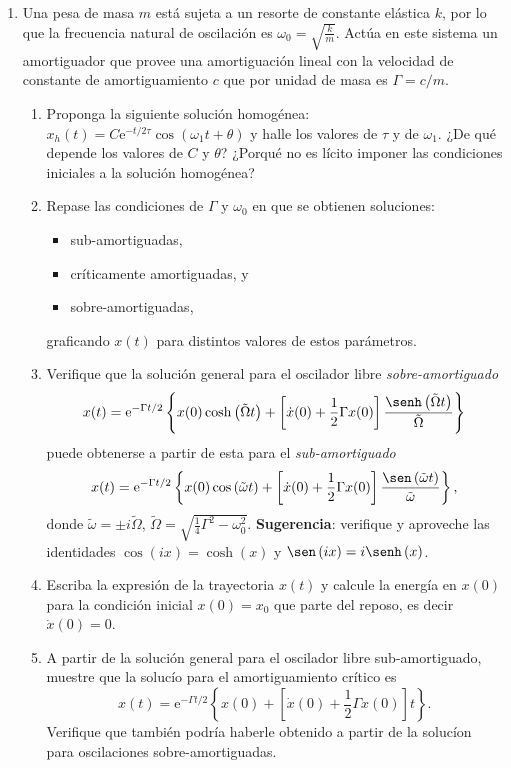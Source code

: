 \documentclass[11pt,spanish,a4paper]{article}
\begin{document}
\begin{enumerate}
\item Una pesa de masa $m$ está sujeta a un resorte de constante elástica $k$, por lo que la frecuencia natural de oscilación es $\omega_0 = \sqrt{ \frac{k}{m} }$.
Actúa en este sistema un amortiguador que provee una amortiguación lineal con la velocidad de constante de amortiguamiento \(c\) que por unidad de masa es $\Gamma= c/m$.
	\begin{enumerate}
	\item Proponga la siguiente solución homogénea: $x_h(t) = C\mathrm{e}^{-t/2\tau}\cos(\omega_1 t + \theta )$ y halle los valores de $\tau$ y de $\omega_1$.
	¿De qué depende los valores de $C$ y $\theta$?
	¿Porqué no es lícito imponer las condiciones iniciales a la solución homogénea?
	\item Repase las condiciones de \(\Gamma\) y \(\omega_0\) en que se obtienen soluciones:
	\begin{itemize}
		\item sub-amortiguadas,
		\item críticamente amortiguadas, y
		\item sobre-amortiguadas,
	\end{itemize} \label{subamortiguado}
	graficando \(x(t)\) para distintos valores de estos parámetros.
	\item Verifique que la solución general para el oscilador libre \emph{sobre-amortiguado}
	\[
		x(t) = \operatorname{e}^{-\Gamma t/2} \left\{ x(0) \cosh \left( \tilde{\Omega}  t \right) + \left[ \dot{x}(0) + \frac{1}{2} \Gamma x(0) \right] \frac{ \senh \left( \tilde{\Omega} t \right) }{ \tilde{\Omega} } \right\} 
	\]
	puede obtenerse a partir de esta para el \emph{sub-amortiguado}
	\[
		x(t) = \operatorname{e}^{-\Gamma t/2} \left\{ x(0) \cos \left( \tilde{\omega} t\right) + \left[ \dot{x}(0) + \frac{1}{2} \Gamma x(0) \right] \frac{ \sen \left( \tilde{\omega} t \right)}{ \tilde{\omega} }\right\}, 
	\]
	donde \(
		\tilde{\omega} = \pm i \tilde{\Omega}
	\), \(
		\tilde{\Omega} = \sqrt{\frac{1}{4}\Gamma^{2}-\omega_{0}^{2}}.
	\)
	\textbf{Sugerencia}: verifique y aproveche las identidades $\cos\left(ix\right)=\cosh\left(x\right)$ y $\sen\left(ix\right)=i\senh\left(x\right)$.
	\item Escriba la expresión de la trayectoria \(x(t)\) y calcule la energía en \(x(0)\) para la condición inicial \(x(0)= x_0\) que parte del reposo, es decir \(\dot{x}(0) = 0\). 
	\item A partir de la solución general para el oscilador libre sub-amortiguado, muestre que la solucío para el amortiguamiento crítico es
	\[
		x(t)=\mathrm{e}^{-\Gamma t/2}\left\{ x(0)+\left[\dot{x}(0)+\frac{1}{2}\Gamma x(0)\right]t\right\} .
		\]
	Verifique que también podría haberle obtenido a partir de la solucíon para oscilaciones sobre-amortiguadas.
\end{enumerate}




\end{enumerate}
\end{document}
